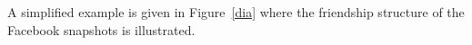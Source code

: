 																																																																																																																																																																																																																																																																																																																																																																																																																																																								A simplified example is given in Figure~\ref{dia} where the friendship
																																																																																																																																																																																																																																																																																																																																																																																																																																																								structure of the Facebook snapshots is illustrated.

